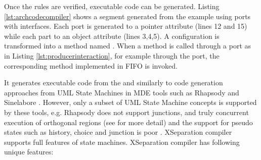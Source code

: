 Once the rules are verified, executable code can be generated. 
Listing \ref{lst:archcodecompiler} shows a  segment generated from the  example using ports with interfaces.
Each port is generated to a pointer attribute (lines 12 and 15) while each part to an object attribute (lines 3,4,5).
A configuration is transformed into a method named .
When a method is called through a port as in Listing \ref{lst:producerinteraction}, for example  through the  port, the corresponding method implemented in FIFO is invoked. 

\begin{minipage}{\columnwidth}
	
\end{minipage} 

\vskip 0.1cm
\noindent
{}
It generates executable code from the  and  similarly to code generation approaches from UML State Machines in MDE tools such as Rhapsody and Sinelabore \cite{sinelabore}.
However, only a subset of UML State Machine concepts is supported by these tools, e.g. Rhapsody does not support junctions, and truly concurrent execution of orthogonal regions
\cite{ibmdiff} (see \cite{specification_uml_2007} for more detail) and the support for pseudo states such as history, choice and junction is poor \cite{EA, sinelabore}. 
XSeparation compiler supports full features of state machines.
XSeparation compiler has following unique features:

